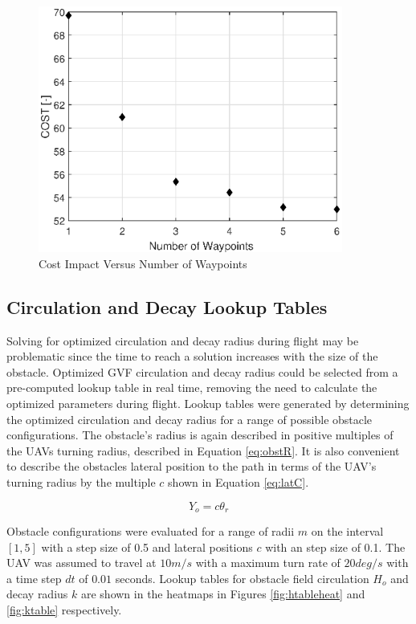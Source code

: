 \documentclass[numbered,pdftex]{ohio-etd}
\begin{document}
\begin{figure}[H]
	\centering
	\includegraphics[width=10cm]{Figures/Waypoints/costVnumWpts}
	\caption{Cost Impact Versus Number of Waypoints}
	\label{fig:numWaypoints}
\end{figure}



\subsection{Circulation and Decay Lookup Tables}
Solving for optimized circulation and decay radius during flight may be problematic since the time to reach a solution increases with the size of the obstacle. Optimized GVF circulation and decay radius could be selected from a pre-computed lookup table in real time, removing the need to calculate the optimized parameters during flight. Lookup tables were generated by determining the optimized circulation and decay radius for a range of possible obstacle configurations. The obstacle's radius is again described in positive multiples of the UAVs turning radius, described in Equation \ref{eq:obstR}. It is also convenient to describe the obstacles lateral position to the path in terms of the UAV's turning radius by the multiple $c$ shown in Equation \ref{eq:latC}.

\begin{equation}
\label{eq:latC}
Y_o = c \theta_r
\end{equation}

Obstacle configurations were evaluated for a range of radii $m$ on the interval $[1,5]$ with a step size of 0.5 and lateral positions $c$ with an step size of 0.1. The UAV was assumed to travel at $10m/s$ with a maximum turn rate of $20 deg/s$ with a time step $dt$ of $0.01$ seconds. Lookup tables for obstacle field circulation $H_o$ and decay radius $k$ are shown in the heatmaps in Figures \ref{fig:htableheat} and \ref{fig:ktable} respectively. 
\end{document}
